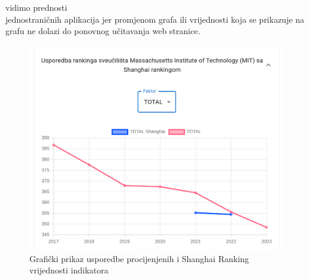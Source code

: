 \documentclass[times, utf8, zavrsni]{fer}
\begin{document}
vidimo prednosti \\jednostraničnih aplikacija jer promjenom grafa ili vrijednosti koja se prikazuje na grafu ne dolazi do ponovnog 
učitavanja web stranice.
\begin{figure}[htb]
    \centering
       \includegraphics[scale=0.3]{uni4.png} 
       \caption{Grafički prikaz usporedbe procijenjenih i Shanghai Ranking vrijednosti indikatora}
       \label{fig:uni4}
       \end{figure} 
       \FloatBarrier
\end{document}
